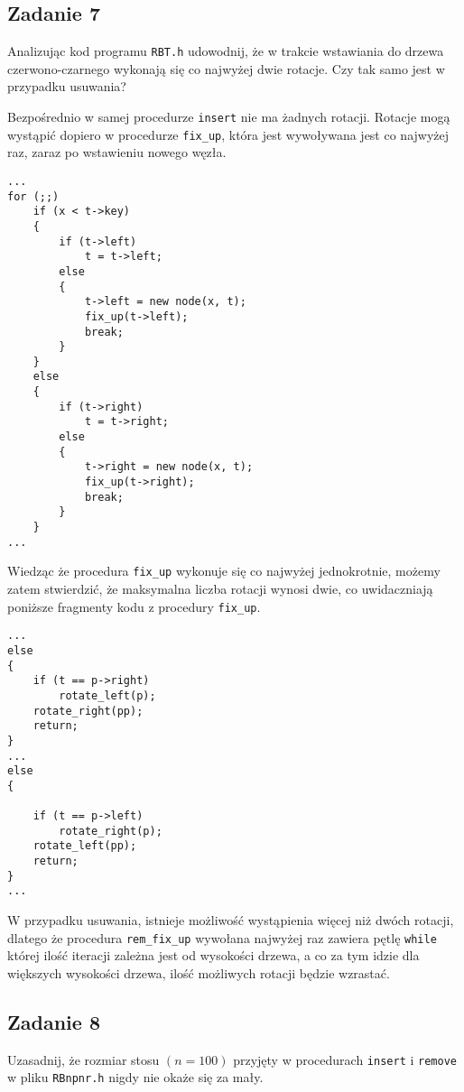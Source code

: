 \documentclass{article}
\begin{document}
\subsection*{Zadanie 7}
Analizując kod programu \verb+RBT.h+ udowodnij, że w trakcie wstawiania do drzewa czerwono-czarnego
wykonają się co najwyżej dwie rotacje. Czy tak samo jest w przypadku usuwania?
\begin{multicols}{2}
    \noindent
    Bezpośrednio w samej procedurze \verb+insert+ nie ma żadnych rotacji. Rotacje mogą wystąpić dopiero w procedurze
    \verb+fix_up+, która jest wywoływana jest co najwyżej raz, zaraz po wstawieniu nowego węzła.
    \begin{lstlisting}
...
for (;;)
    if (x < t->key)
    {
        if (t->left)
            t = t->left;
        else
        {
            t->left = new node(x, t);
            fix_up(t->left);
            break;
        }
    }
    else
    {
        if (t->right)
            t = t->right;
        else
        {
            t->right = new node(x, t);
            fix_up(t->right);
            break;
        }
    }
...
    \end{lstlisting}
    \columnbreak
    Wiedząc że procedura \verb+fix_up+ wykonuje się co najwyżej jednokrotnie, możemy zatem stwierdzić, że maksymalna
    liczba rotacji wynosi dwie, co uwidaczniają poniższe fragmenty kodu z procedury \verb+fix_up+.
    \begin{lstlisting}
...
else
{
    if (t == p->right)
        rotate_left(p);
    rotate_right(pp);
    return;
}
...
else
{

    if (t == p->left)
        rotate_right(p);
    rotate_left(pp);
    return;
}
...
    \end{lstlisting}
\end{multicols}
\noindent
W przypadku usuwania, istnieje możliwość wystąpienia więcej niż dwóch rotacji, dlatego że procedura \verb+rem_fix_up+
wywołana najwyżej raz zawiera pętlę \verb+while+ której ilość iteracji zależna jest od wysokości drzewa, a co za tym
idzie dla większych wysokości drzewa, ilość możliwych rotacji będzie wzrastać.

\subsection*{Zadanie 8}
Uzasadnij, że rozmiar stosu $(n = 100)$ przyjęty w procedurach \verb+insert+ i \verb+remove+ w pliku
\verb+RBnpnr.h+ nigdy nie okaże się za mały.
\end{document}
